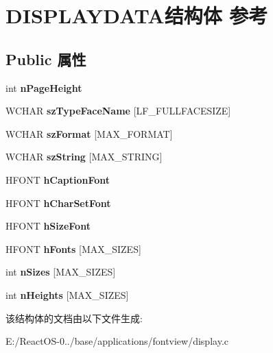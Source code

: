 \hypertarget{struct_d_i_s_p_l_a_y_d_a_t_a}{}\section{D\+I\+S\+P\+L\+A\+Y\+D\+A\+T\+A结构体 参考}
\label{struct_d_i_s_p_l_a_y_d_a_t_a}
\subsection*{Public 属性}
\begin{DoxyCompactItemize}
\item 
\mbox{\label{struct_d_i_s_p_l_a_y_d_a_t_a_a17d10edff8f1c9e0de6bb8035e05faf2}} 
int {\bfseries n\+Page\+Height}
\item 
\mbox{\label{struct_d_i_s_p_l_a_y_d_a_t_a_a148f799de9681f3087728a3ad253f85e}} 
W\+C\+H\+AR {\bfseries sz\+Type\+Face\+Name} \mbox{[}L\+F\+\_\+\+F\+U\+L\+L\+F\+A\+C\+E\+S\+I\+ZE\mbox{]}
\item 
\mbox{\label{struct_d_i_s_p_l_a_y_d_a_t_a_ab54deb49a4253944dfbb10cc6eb68d58}} 
W\+C\+H\+AR {\bfseries sz\+Format} \mbox{[}M\+A\+X\+\_\+\+F\+O\+R\+M\+AT\mbox{]}
\item 
\mbox{\label{struct_d_i_s_p_l_a_y_d_a_t_a_a8ff4ec7d6a5d91dbb600faf96909ff8d}} 
W\+C\+H\+AR {\bfseries sz\+String} \mbox{[}M\+A\+X\+\_\+\+S\+T\+R\+I\+NG\mbox{]}
\item 
\mbox{\label{struct_d_i_s_p_l_a_y_d_a_t_a_a6f26e2018f95eb68e1dfe765c65ad1b1}} 
H\+F\+O\+NT {\bfseries h\+Caption\+Font}
\item 
\mbox{\label{struct_d_i_s_p_l_a_y_d_a_t_a_a7b68f6936b19c5cb93426695ddcd7284}} 
H\+F\+O\+NT {\bfseries h\+Char\+Set\+Font}
\item 
\mbox{\label{struct_d_i_s_p_l_a_y_d_a_t_a_ace8cc406ff91d71a9ef5297da842f22c}} 
H\+F\+O\+NT {\bfseries h\+Size\+Font}
\item 
\mbox{\label{struct_d_i_s_p_l_a_y_d_a_t_a_ab27c92747223fee635bc330e6dba4ec6}} 
H\+F\+O\+NT {\bfseries h\+Fonts} \mbox{[}M\+A\+X\+\_\+\+S\+I\+Z\+ES\mbox{]}
\item 
\mbox{\label{struct_d_i_s_p_l_a_y_d_a_t_a_a43787ca60ded7fe79264e8f1a82b2801}} 
int {\bfseries n\+Sizes} \mbox{[}M\+A\+X\+\_\+\+S\+I\+Z\+ES\mbox{]}
\item 
\mbox{\label{struct_d_i_s_p_l_a_y_d_a_t_a_ab2541bf0d0fd7b9031e2666350f3e37c}} 
int {\bfseries n\+Heights} \mbox{[}M\+A\+X\+\_\+\+S\+I\+Z\+ES\mbox{]}
\end{DoxyCompactItemize}


该结构体的文档由以下文件生成\+:\begin{DoxyCompactItemize}
\item 
E\+:/\+React\+O\+S-\/0../base/applications/fontview/display.\+c\end{DoxyCompactItemize}
